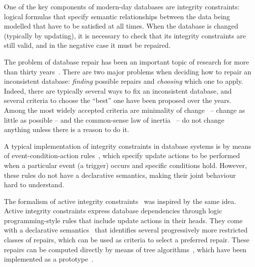 One of the key components of modern-day databases are integrity constraints: logical formulas that specify semantic relationships between the data being modelled that have to be satisfied at all times.
When the database is changed (typically by updating), it is necessary to check that its integrity constraints are still valid, and in the negative case it must be repaired.

The problem of database repair has been an important topic of research for more than thirty years~\cite{icdt/Abiteboul88}.
There are two major problems when deciding how to repair an inconsistent database: \emph{finding} possible repairs and \emph{choosing} which one to apply.
Indeed, there are typically several ways to fix an inconsistent database, and several criteria to choose the ``best'' one have been proposed over the years.
Among the most widely accepted criteria are minimality of change~\cite{Winslett90,ai/EiterG92} -- change as little as possible -- and the common-sense law of inertia~\cite{PrzymusinskiT97} -- do not change anything unless there is a reason to do it.

A typical implementation of integrity constraints in database systems is by means of event-condition-action rules~\cite{TenienteO95,WidomC96}, which specify update actions to be performed when a particular event (a trigger) occurs and specific conditions hold.
However, these rules do not have a declarative semantics, making their joint behaviour hard to understand.

The formalism of active integrity constraints~\cite{ppdp/FlescaGZ04} was inspired by the same idea.
Active integrity constraints express database dependencies through logic programming-style rules that include update actions in their heads.
They come with a declarative semantics~\cite{iclp/CaropreseGSZ06,tplp/CaropreseT11} that identifies several progressively more restricted classes of repairs, which can be used as criteria to select a preferred repair.
These repairs can be computed directly by means of tree algorithms~\cite{tase/Cruz-FilipeEGN13}, which have been implemented as a prototype~\cite{CFHLNS15}.

